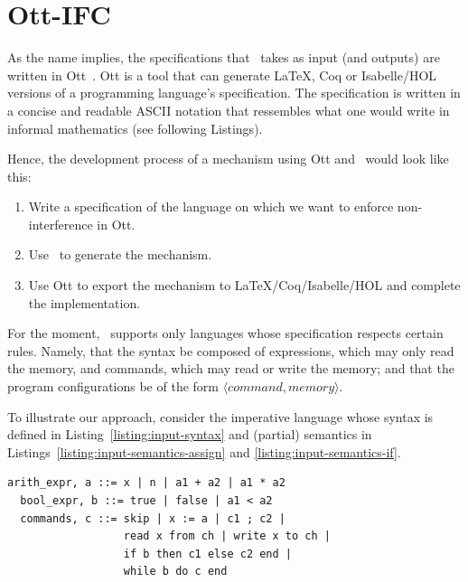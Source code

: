 \documentclass[sigplan,10pt,screen]{acmart}
\begin{document}
\section{Ott-IFC}\label{section:ott-ifc}
As the name implies, the specifications that \ottifc\ takes as input (and outputs) are written in Ott~\cite{DBLP:journals/jfp/SewellNOPRSS10}. Ott is a tool that can generate LaTeX, Coq or Isabelle/HOL versions of a programming language's specification. The specification is written in a concise and readable ASCII notation that ressembles what one would write in informal mathematics (see following Listings).

Hence, the development process of a mechanism using Ott and \ottifc\ would look like this:
\begin{enumerate}
  \item Write a specification of the language on which we want to enforce non-interference in Ott.
  \item Use \ottifc\ to generate the mechanism.
  \item Use Ott to export the mechanism to LaTeX/Coq/Isabelle/HOL and complete the implementation.
\end{enumerate}


For the moment, \ottifc\ supports only languages whose specification respects certain rules. Namely, that the syntax be composed of expressions, which may only read the memory, and commands, which may read or write the memory; and that the program configurations be of the form $\langle command, memory\rangle$. 

To illustrate our approach, consider the imperative language whose syntax is defined in Listing~\ref{listing:input-syntax} and (partial) semantics in Listings~\ref{listing:input-semantics-assign} and \ref{listing:input-semantics-if}.

\begin{lstlisting}[label=listing:input-syntax,captionpos=b,caption=Ott syntax of a simple imperative language]
  arith_expr, a ::= x | n | a1 + a2 | a1 * a2 
  bool_expr, b ::= true | false | a1 < a2
  commands, c ::= skip | x := a | c1 ; c2 | 
                  read x from ch | write x to ch |
                  if b then c1 else c2 end | 
                  while b do c end

\end{lstlisting}
\end{document}
